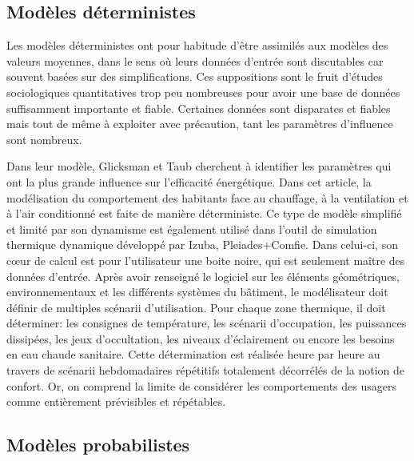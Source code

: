 \subsection{Modèles déterministes}

Les modèles déterministes ont pour habitude d'être assimilés aux modèles des valeurs moyennes, dans le sens où leurs données d'entrée sont discutables car souvent basées sur des simplifications. Ces suppositions sont le fruit d'études sociologiques quantitatives trop peu nombreuses pour avoir une base de données suffisamment importante et fiable. Certaines données sont disparates et fiables mais tout de même à exploiter avec précaution, tant les paramètres d'influence sont nombreux.

Dans leur modèle, Glicksman et Taub \cite{Glicksman-97} cherchent à identifier les paramètres qui ont la plus grande influence sur l'efficacité énergétique. Dans cet article, la modélisation du comportement des habitants face au chauffage, à la ventilation et à l'air conditionné est faite de manière déterministe. Ce type de modèle simplifié et limité par son dynamisme est également utilisé dans l'outil de simulation thermique dynamique développé par Izuba, Pleiades+Comfie. Dans celui-ci, son cœur de calcul est pour l'utilisateur une boite noire, qui est seulement maître des données d'entrée. Après avoir renseigné le logiciel sur les éléments géométriques, environnementaux et les différents systèmes du bâtiment, le modélisateur doit définir de multiples scénarii d'utilisation. Pour chaque zone thermique, il doit déterminer: les consignes de température, les scénarii d'occupation, les puissances dissipées, les jeux d'occultation, les niveaux d'éclairement ou encore les besoins en eau chaude sanitaire. Cette détermination est réalisée heure par heure au travers de scénarii hebdomadaires répétitifs totalement décorrélés de la notion de confort. Or, on comprend la limite de considérer les comportements des usagers comme entièrement prévisibles et répétables.

\subsection{Modèles probabilistes}

